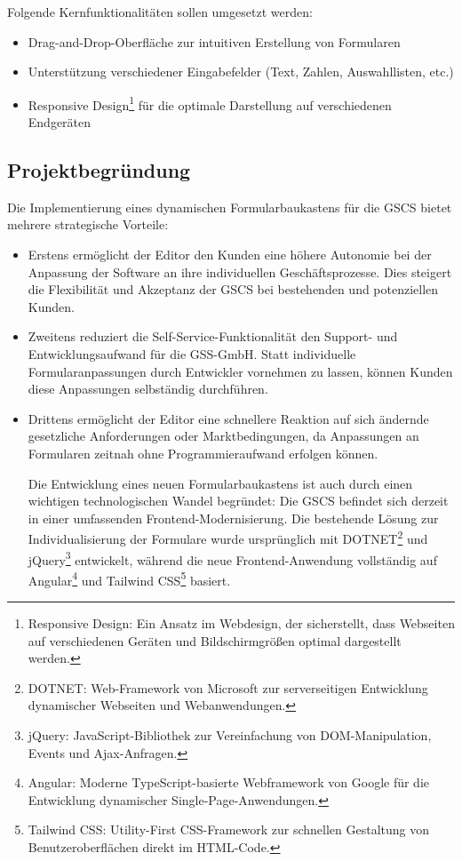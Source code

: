 \documentclass[a4paper,11pt]{article}
\begin{document}
Folgende Kernfunktionalitäten sollen umgesetzt werden:
\begin{itemize}
  \item Drag-and-Drop-Oberfläche zur intuitiven Erstellung von Formularen
  \item Unterstützung verschiedener Eingabefelder (Text, Zahlen, Auswahllisten, etc.)
  \item Responsive Design\footnote{Responsive Design: Ein Ansatz im Webdesign, der sicherstellt, dass Webseiten auf verschiedenen Geräten und Bildschirmgrößen optimal dargestellt werden.} für die optimale Darstellung auf verschiedenen Endgeräten
\end{itemize}

\subsection{Projektbegründung}
Die Implementierung eines dynamischen Formularbaukastens für die GSCS bietet mehrere strategische Vorteile:
\begin{itemize}
\item Erstens ermöglicht der Editor den Kunden eine höhere Autonomie bei der Anpassung der Software an ihre individuellen Geschäftsprozesse. Dies steigert die Flexibilität und Akzeptanz der GSCS bei bestehenden und potenziellen Kunden.

\item Zweitens reduziert die Self-Service-Funktionalität den Support- und Entwicklungsaufwand für die GSS-GmbH. Statt individuelle Formularanpassungen durch Entwickler vornehmen zu lassen, können Kunden diese Anpassungen selbständig durchführen.

\item Drittens ermöglicht der Editor eine schnellere Reaktion auf sich ändernde gesetzliche Anforderungen oder Marktbedingungen, da Anpassungen an Formularen zeitnah ohne Programmieraufwand erfolgen können.

\noindent Die Entwicklung eines neuen Formularbaukastens ist auch durch einen wichtigen technologischen Wandel begründet: Die GSCS befindet sich derzeit in einer umfassenden Frontend-Modernisierung. Die bestehende Lösung zur Individualisierung der Formulare wurde ursprünglich mit DOTNET\footnote{DOTNET: Web-Framework von Microsoft zur serverseitigen Entwicklung dynamischer Webseiten und Webanwendungen.} und jQuery\footnote{jQuery: JavaScript-Bibliothek zur Vereinfachung von DOM-Manipulation, Events und Ajax-Anfragen.} entwickelt, während die neue Frontend-Anwendung vollständig auf Angular\footnote{Angular: Moderne TypeScript-basierte Webframework von Google für die Entwicklung dynamischer Single-Page-Anwendungen.} und Tailwind CSS\footnote{Tailwind CSS: Utility-First CSS-Framework zur schnellen Gestaltung von Benutzeroberflächen direkt im HTML-Code.} basiert.

\end{itemize}
\end{document}
